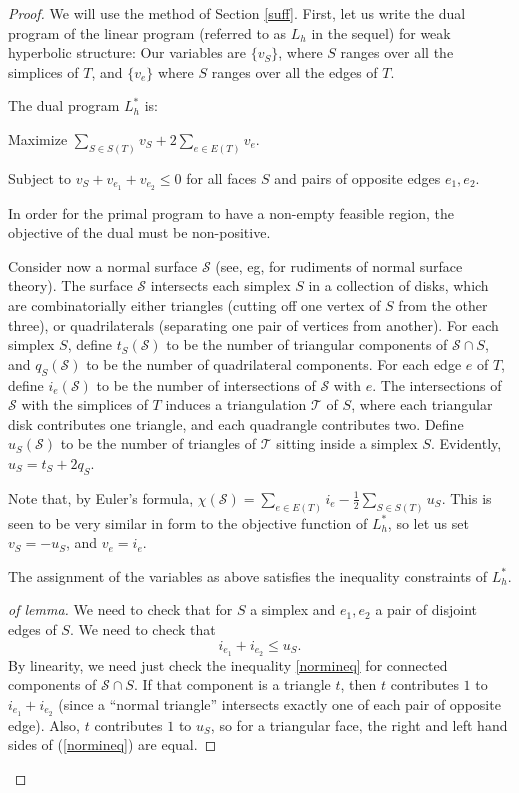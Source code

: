 \documentclass{acmart}
\newcommand{\thm}[2]{\begin{#1} #2 \end{#1}}
\begin{document}
\thm{proof}
{
We will use the method of Section \ref{suff}. First, let us write the
dual program of the linear program (referred to as $L_h$ in the
sequel) for weak hyperbolic structure: Our
variables are $\{v_S\}$, where $S$ ranges over all the simplices of
$T$, and $\{v_e\}$ where $S$ ranges over all the edges of $T$. 

The dual program $L_h^*$ is: 

\begin{description}

\item{Maximize} $\sum_{S\in S(T)} v_S + 2 \sum_{e \in E(T)} v_e$.

\item{Subject to} $v_S + v_{e_1} + v_{e_2}\leq 0$ for all faces $S$
  and pairs of opposite edges $e_1, e_2$.
\end{description}

In order for the primal program to have a non-empty feasible region,
the objective of the dual must be non-positive.

Consider now a normal surface $\mathcal{S}$ (see, eg,
\cite{hack,jaco,hemion} for rudiments of normal surface theory). The
surface $\mathcal{S}$ intersects each simplex $S$ in a collection of
disks, which are combinatorially either triangles (cutting off one
vertex of $S$ from the other three), or quadrilaterals (separating one
pair of vertices from another). For each simplex $S$, define
$t_S(\mathcal{S})$ to be the number of triangular components of
$\mathcal{S} \cap S$, and $q_S(\mathcal{S})$ to be the number of
quadrilateral components. For each edge $e$ 
of $T$, define $i_e(\mathcal{S})$ to be the number of intersections of
$\mathcal{S}$ with $e$. The intersections of $\mathcal{S}$ with the
simplices of $T$ induces a triangulation $\mathcal{T}$ of $S$, where each triangular
disk contributes one triangle, and each quadrangle contributes
two. Define $u_S(\mathcal{S})$ to be the number of triangles of
$\mathcal{T}$ sitting inside a simplex $S$. Evidently, $u_S = t_S + 2
q_S$. 

Note that, by Euler's formula, $\chi(\mathcal{S}) = \sum_{e \in E(T)}
i_e -\frac12 \sum_{S \in S(T)} u_S$. This is seen to be very similar in form
to the objective function of $L_h^*$, so let us set
$v_S = - u_S$, and $v_e = i_e$. 

\thm{lemma}
{
\label{normvar}
The assignment of the variables as above satisfies the inequality
constraints of $L_h^*$.
}

\begin{proof}[of lemma]
We need to check that for $S$ a simplex and $e_1, e_2$ a pair of
disjoint edges of $S$. We need to check that 
\begin{equation}
\label{normineq}
i_{e_1} + i_{e_2} \leq u_S.
\end{equation}
By linearity, we need just check the inequality \ref{normineq} for
connected components of $\mathcal{S} \cap S$. If that component is a
triangle $t$, then $t$ contributes $1$ to $i_{e_1} + i_{e_2}$ (since a
``normal triangle'' intersects exactly one of each pair of opposite
edge). Also, $t$ contributes $1$ to $u_S$, so for a triangular face,
the right and left hand sides of (\ref{normineq}) are equal.


\end{proof}}
\end{document}
